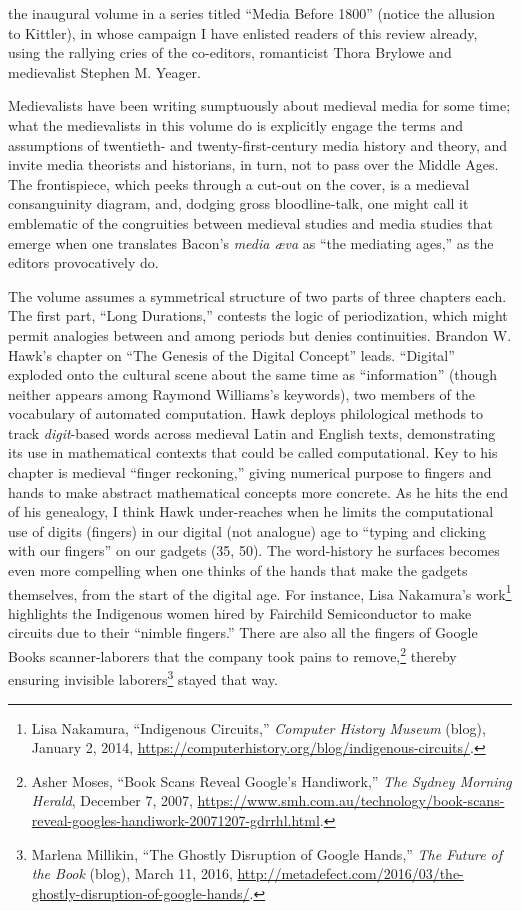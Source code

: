 \documentclass{tufte-handout}
\begin{document}
\noindent the inaugural volume in a series titled ``Media
Before 1800'' (notice the allusion to Kittler), in whose campaign I have
enlisted readers of this review already, using the rallying cries of the
co-editors, romanticist Thora Brylowe and medievalist Stephen M. Yeager.

Medievalists have been writing sumptuously about medieval media for some
time; what the medievalists in this volume do is explicitly engage the
terms and assumptions of twentieth- and twenty-first-century media
history and theory, and invite media theorists and historians, in turn,
not to pass over the Middle Ages. The frontispiece, which peeks through
a cut-out on the cover, is a medieval consanguinity diagram, and,
dodging gross bloodline-talk, one might call it emblematic of the
congruities between medieval studies and media studies that emerge when
one translates Bacon's \emph{media æva} as ``the mediating ages,'' as
the editors provocatively do.

The volume assumes a symmetrical structure of two parts of three
chapters each. The first part, ``Long Durations,'' contests the logic of
periodization, which might permit analogies between and among periods
but denies continuities. Brandon W. Hawk's chapter on ``The Genesis of
the Digital Concept'' leads. ``Digital'' exploded onto the cultural
scene about the same time as ``information'' (though neither appears
among Raymond Williams's keywords), two members of the vocabulary of
automated computation. Hawk deploys philological methods to track
\emph{digit}-based words across medieval Latin and English texts,
demonstrating its use in mathematical contexts that could be called
computational. Key to his chapter is medieval ``finger reckoning,''
giving numerical purpose to fingers and hands to make abstract
mathematical concepts more concrete. As he hits the end of his
genealogy, I think Hawk under-reaches when he limits the computational
use of digits (fingers) in our digital (not analogue) age to ``typing
and clicking with our fingers'' on our gadgets (35, 50). The
word-history he surfaces becomes even more compelling when one thinks of
the hands that make the gadgets themselves, from the start of the
digital age. For instance, Lisa Nakamura's work\footnote{Lisa Nakamura,
  ``Indigenous Circuits,'' \emph{Computer History Museum} (blog),
  January 2, 2014,
  \url{https://computerhistory.org/blog/indigenous-circuits/}.} highlights the
Indigenous women hired by Fairchild Semiconductor to make circuits due
to their ``nimble fingers.'' There are also all the fingers of Google
Books scanner-laborers that the company took pains to remove,\footnote{Asher
  Moses, ``Book Scans Reveal Google's Handiwork,'' \emph{The Sydney
  Morning Herald}, December 7, 2007,
  \href{https://www.smh.com.au/technology/book-scans-reveal-googles-handiwork-20071207-gdrrhl.html}{https://www.smh.com.au/technology/book-scans-reveal-googles-handiwork-20071207-gdrrhl.html}.}
thereby ensuring invisible laborers\footnote{Marlena Millikin, ``The
  Ghostly Disruption of Google Hands,'' \emph{The Future of the Book}
  (blog), March 11, 2016,
  \href{http://metadefect.com/2016/03/the-ghostly-disruption-of-google-hands/}{http://metadefect.com/2016/03/the-ghostly-disruption-of-google-hands/}.}
stayed that way.
\end{document}
